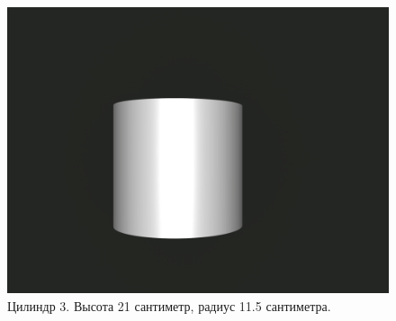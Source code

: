 \begin{figure}[H]
	\centering

	\begin{minipage}{1\textwidth}
		\centering
		\includegraphics[scale=0.2]{img/16_0115_021.png}
		\caption{Цилиндр 3. Высота 21 сантиметр, радиус 11.5 сантиметра.}
		\label{class:c3}
	\end{minipage}
\end{figure}

